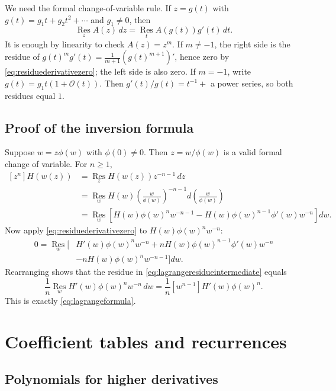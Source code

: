 \documentclass[11pt,oneside]{book}
\theoremstyle{definition}
\theoremstyle{remark}
\newcommand{\Res}{\operatorname*{Res}}
\newcommand{\bigO}{\mathcal O}
\begin{document}
We need the formal change-of-variable rule.  If $z=g(t)$ with
$g(t)=g_1t+g_2t^2+\cdots$ and $g_1\ne0$, then
\begin{equation}\label{eq:formalchange}
 \Res_z A(z)\,dz
 =\Res_t A(g(t))g'(t)\,dt.
\end{equation}
It is enough by linearity to check $A(z)=z^m$.  If $m\ne-1$, the right side
is the residue of
$g(t)^m g'(t)=\frac1{m+1}(g(t)^{m+1})'$, hence zero by
\eqref{eq:residuederivativezero}; the left side is also zero.  If $m=-1$,
write $g(t)=g_1t(1+\bigO(t))$.  Then $g'(t)/g(t)=t^{-1}+$ a power series, so
both residues equal $1$.

\section{Proof of the inversion formula}

Suppose $w=z\phi(w)$ with $\phi(0)\ne0$.  Then
$z=w/\phi(w)$ is a valid formal change of variable.  For $n\ge1$,
\begin{equation}\label{eq:lagrangeresidueintermediate}
\begin{aligned}
 [z^n]H(w(z))
 &=\Res_z H(w(z))z^{-n-1}\,dz\\
 &=\Res_w H(w)
   \left(\frac{w}{\phi(w)}\right)^{-n-1}
   d\!\left(\frac{w}{\phi(w)}\right)\\
 &=\Res_w\left[
 H(w)\phi(w)^n w^{-n-1}
 -H(w)\phi(w)^{n-1}\phi'(w)w^{-n}
 \right]dw.
\end{aligned}
\end{equation}
Now apply \eqref{eq:residuederivativezero} to
$H(w)\phi(w)^n w^{-n}$:
\begin{align*}
0=\Res_w\bigl[
&H'(w)\phi(w)^n w^{-n}
+nH(w)\phi(w)^{n-1}\phi'(w)w^{-n}\\
&-nH(w)\phi(w)^n w^{-n-1}
\bigr]dw.
\end{align*}
Rearranging shows that the residue in
\eqref{eq:lagrangeresidueintermediate} equals
\[
 \frac1n\Res_w H'(w)\phi(w)^n w^{-n}\,dw
 =\frac1n[w^{n-1}]H'(w)\phi(w)^n.
\]
This is exactly \eqref{eq:lagrangeformula}.


\chapter{Coefficient tables and recurrences}\label{app:coefficients}

\section{Polynomials for higher derivatives}
\end{document}
